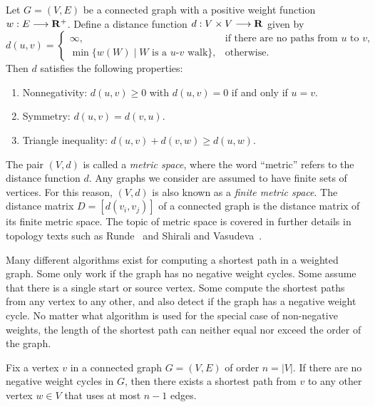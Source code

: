 \begin{lemma}
Let $G = (V,E)$ be a connected graph with a positive weight function
$w: E \longrightarrow \mathbf{R}^{+}$. Define a distance function
$d: V \times V \longrightarrow \mathbf{R}$ given by
\[
d(u,v)
=
\begin{cases}
\infty, & \text{if there are no paths from $u$ to $v$}, \\
\min\{w(W) \;|\; \text{$W$ is a $u$-$v$ walk}\}, & \text{otherwise}.
\end{cases}
\]
Then $d$ satisfies the following properties:
%
\begin{enumerate}
\item Nonnegativity: $d(u,v) \geq 0$ with $d(u,v) = 0$ if and only if
  $u = v$.

\item Symmetry: $d(u,v) = d(v,u)$.

\item Triangle inequality: $d(u,v) + d(v,w) \geq d(u,w)$.
\end{enumerate}
\end{lemma}

The pair $(V, d)$ is called a \emph{metric space}, where the word
``metric'' refers to the distance function $d$. Any graphs we consider
are assumed to have finite sets of vertices. For this reason, $(V,d)$
is also known as a \emph{finite metric space}. The distance matrix
$D = [d(v_i, v_j)]$ of a connected graph is the distance matrix of its
finite metric space. The topic of metric space is covered in further
details in topology texts such as Runde~\cite{Runde2005} and Shirali
and Vasudeva~\cite{ShiraliVasudeva2006}.

Many different algorithms exist for computing a shortest path in a
weighted graph. Some only work if the graph has no negative weight
cycles. Some assume that there is a single start or source
vertex. Some compute the shortest paths from any vertex to any other,
and also detect if the graph has a negative weight cycle. No matter
what algorithm is used for the special case of non-negative weights,
the length of the shortest path can neither equal nor exceed the order
of the graph.

\begin{lemma}
\label{lem:graph_algorithms:shortest_path_length}
Fix a vertex $v$ in a connected graph $G = (V,E)$ of order
$n = |V|$. If there are no negative weight cycles in $G$, then there
exists a shortest path from $v$ to any other vertex $w \in V$ that
uses at most $n - 1$ edges.
\end{lemma}


